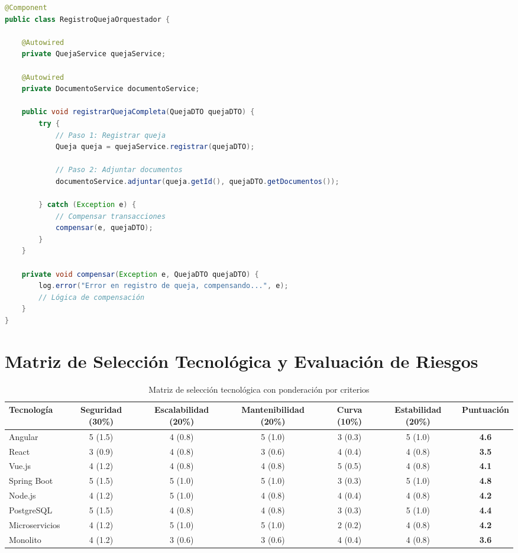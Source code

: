 \begin{lstlisting}[language=Java, caption=Patrón SAGA orquestado]
@Component
public class RegistroQuejaOrquestador {
    
    @Autowired
    private QuejaService quejaService;
    
    @Autowired
    private DocumentoService documentoService;
    
    public void registrarQuejaCompleta(QuejaDTO quejaDTO) {
        try {
            // Paso 1: Registrar queja
            Queja queja = quejaService.registrar(quejaDTO);
            
            // Paso 2: Adjuntar documentos
            documentoService.adjuntar(queja.getId(), quejaDTO.getDocumentos());
            
        } catch (Exception e) {
            // Compensar transacciones
            compensar(e, quejaDTO);
        }
    }
    
    private void compensar(Exception e, QuejaDTO quejaDTO) {
        log.error("Error en registro de queja, compensando...", e);
        // Lógica de compensación
    }
}
\end{lstlisting}

\section{Matriz de Selección Tecnológica y Evaluación de Riesgos}

\begin{table}[htbp]
\centering
\caption{Matriz de selección tecnológica con ponderación por criterios}
\label{tab:matriz-seleccion}
\small
\begin{tabular}{|p{2.2cm}|c|c|c|c|c|c|}
\hline
\textbf{Tecnología} & \textbf{Seguridad (30\%)} & \textbf{Escalabilidad (20\%)} & \textbf{Mantenibilidad (20\%)} & \textbf{Curva (10\%)} & \textbf{Estabilidad (20\%)} & \textbf{Puntuación} \\
\hline
Angular & 5 (1.5) & 4 (0.8) & 5 (1.0) & 3 (0.3) & 5 (1.0) & \textbf{4.6} \\
\hline
React & 3 (0.9) & 4 (0.8) & 3 (0.6) & 4 (0.4) & 4 (0.8) & \textbf{3.5} \\
\hline
Vue.js & 4 (1.2) & 4 (0.8) & 4 (0.8) & 5 (0.5) & 4 (0.8) & \textbf{4.1} \\
\hline
Spring Boot & 5 (1.5) & 5 (1.0) & 5 (1.0) & 3 (0.3) & 5 (1.0) & \textbf{4.8} \\
\hline
Node.js & 4 (1.2) & 5 (1.0) & 4 (0.8) & 4 (0.4) & 4 (0.8) & \textbf{4.2} \\
\hline
PostgreSQL & 5 (1.5) & 4 (0.8) & 4 (0.8) & 3 (0.3) & 5 (1.0) & \textbf{4.4} \\
\hline
Microservicios & 4 (1.2) & 5 (1.0) & 5 (1.0) & 2 (0.2) & 4 (0.8) & \textbf{4.2} \\
\hline
Monolito & 4 (1.2) & 3 (0.6) & 3 (0.6) & 4 (0.4) & 4 (0.8) & \textbf{3.6} \\
\hline
\end{tabular}
\end{table}

